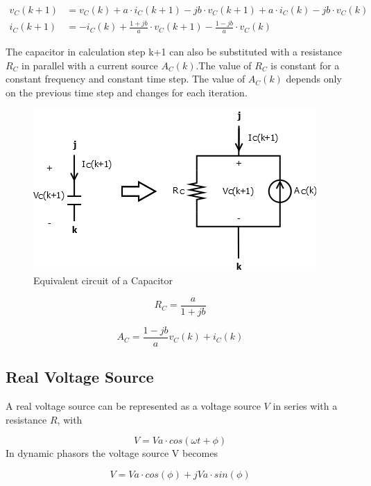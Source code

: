 \begin{align}
        v_C(k+1) &= v_C(k) + a \cdot i_C(k+1) - j b \cdot v_C(k+1) + a \cdot i_C(k) - j b \cdot v_C(k) \\
        i_C(k+1) &= -i_C(k) + \frac{1+jb}{a} \cdot v_C(k+1) - \frac{1-jb}{a} \cdot v_C(k)
\end{align}

The capacitor in calculation step k+1 can also be substituted with a resistance $R_C$ in parallel with a current source $A_C(k)$.The value of $R_C$ is constant for a constant frequency and constant time step. The value of $A_C(k)$ depends only on the previous time step and changes for each iteration.

\begin{figure}[ht]
	\centering
	\includegraphics[scale=0.6]{img/Capacitor.png} 
	\caption{Equivalent circuit of a Capacitor}
	\label{fig:Capacitor}
\end{figure}

\begin{equation}
	R_C = \frac{a}{1+jb}
\end{equation}

\begin{equation}
	A_C = \frac{1-jb}{a} v_C(k) + i_C(k)
\end{equation}

\subsection{Real Voltage Source}

A real voltage source can be represented as a voltage source $V$ in series with a resistance $R$, with

\begin{equation}
V=Va \cdot cos(\omega t + \phi)
\end{equation}
In dynamic phasors the voltage source V becomes

\begin{equation}
V = Va \cdot cos (\phi) + jVa \cdot sin(\phi) 
\end{equation}

